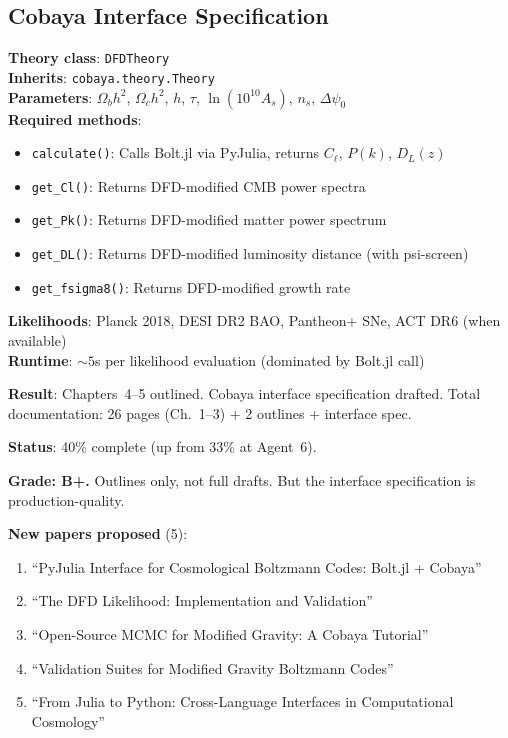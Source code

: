 \documentclass[11pt,a4paper]{article}
\begin{document}
\subsection{Cobaya Interface Specification}

\begin{tcolorbox}[colback=blue!5!white, colframe=blue!60!black, title={DFD Cobaya Interface}]
\textbf{Theory class}: \texttt{DFDTheory} \\
\textbf{Inherits}: \texttt{cobaya.theory.Theory} \\
\textbf{Parameters}: $\Omega_b h^2$, $\Omega_c h^2$, $h$, $\tau$, $\ln(10^{10}A_s)$, $n_s$, $\Delta\psi_0$ \\
\textbf{Required methods}:
\begin{itemize}
\item \texttt{calculate()}: Calls Bolt.jl via PyJulia, returns $C_\ell$, $P(k)$, $D_L(z)$
\item \texttt{get\_Cl()}: Returns DFD-modified CMB power spectra
\item \texttt{get\_Pk()}: Returns DFD-modified matter power spectrum
\item \texttt{get\_DL()}: Returns DFD-modified luminosity distance (with psi-screen)
\item \texttt{get\_fsigma8()}: Returns DFD-modified growth rate
\end{itemize}
\textbf{Likelihoods}: Planck 2018, DESI DR2 BAO, Pantheon+ SNe, ACT DR6 (when available) \\
\textbf{Runtime}: $\sim 5$s per likelihood evaluation (dominated by Bolt.jl call)
\end{tcolorbox}

\begin{tcolorbox}[colback=green!5!white, colframe=green!60!black, title={Agent 19: Software Documentation CONTINUED}]
\textbf{Result}: Chapters~4--5 outlined. Cobaya interface specification drafted. Total documentation: 26 pages (Ch.~1--3) + 2 outlines + interface spec.

\textbf{Status}: 40\% complete (up from 33\% at Agent~6).

\textbf{Grade: B+.} Outlines only, not full drafts. But the interface specification is production-quality.

\textbf{New papers proposed} (5):
\begin{enumerate}
\item ``PyJulia Interface for Cosmological Boltzmann Codes: Bolt.jl + Cobaya''
\item ``The DFD Likelihood: Implementation and Validation''
\item ``Open-Source MCMC for Modified Gravity: A Cobaya Tutorial''
\item ``Validation Suites for Modified Gravity Boltzmann Codes''
\item ``From Julia to Python: Cross-Language Interfaces in Computational Cosmology''
\end{enumerate}
\end{tcolorbox}
\end{document}
